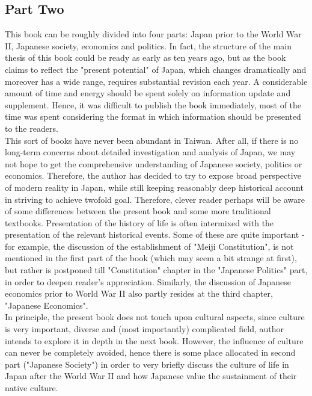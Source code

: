 \documentclass[11pt]{book}
\begin{document}
\subsection*{Part Two}
This book can be roughly divided into four parts: Japan prior to the World War II, Japanese society, economics and politics. In fact, the 
structure of the main thesis of this book could be ready as early as ten years ago, but as the book claims to reflect the "present potential"
of Japan, which changes dramatically and moreover has a wide range, requires substantial revision each year. A considerable amount of time and
energy should be spent solely on information update and supplement. Hence, it was difficult to publish the book immediately, most of the time
was spent considering the format in which information should be presented to the readers.\\
This sort of books have never been abundant in Taiwan. After all, if there is no long-term concerns about detailed investigation and analysis
of Japan, we may not hope to get the comprehensive understanding of Japanese society, politics or economics. Therefore, the author has decided
to try to expose broad perspective of modern reality in Japan, while still keeping reasonably deep historical account in striving to achieve
twofold goal. Therefore, clever reader perhaps will be aware of some differences between the present book and some more traditional textbooks.
Presentation of the history of life is often intermixed with the presentation of the relevant historical events. Some of these are
quite important - for example, the discussion of the establishment of "Meiji Constitution", is not mentioned in the first part of the book
(which may seem a bit strange at first), but rather is postponed till "Constitution" chapter in the "Japanese Politics" part, in order
to deepen reader's appreciation. Similarly, the discussion of Japanese economics prior to World War II also partly resides at the third chapter,
"Japanese Economics".\\
In principle, the present book does not touch upon cultural aspects, since culture is very important, diverse and (most importantly) complicated
field, author intends to explore it in depth in the next book. However, the influence of culture can never be completely avoided, hence
there is some place allocated in second part ("Japanese Society") in order to very briefly discuss the culture of life in Japan after the World War II
and how Japanese value the sustainment of their native culture.\\
\end{document}

